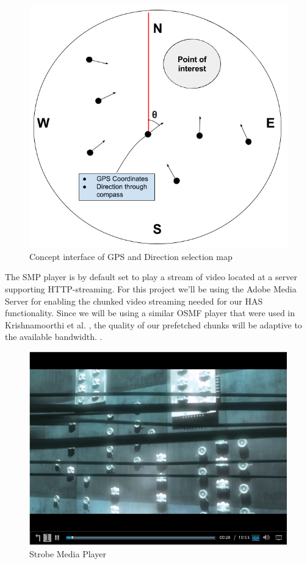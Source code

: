 \documentclass[9pt,a4paper]{acmproc}
\begin{document}
\begin{figure}[t!]
\begin{center}
	\includegraphics[scale=0.5]{teomet.png}
	\caption{Concept interface of GPS and Direction selection map}
	\label{fig:gpsinterface}
\end{center}
\end{figure}


The SMP player is by default set to play a stream of video located at a server supporting HTTP-streaming. For this project we'll be using the Adobe Media Server for enabling the chunked video streaming needed for our HAS functionality. Since we will be using a similar OSMF player that were used in Krishnamoorthi et al. \cite{hasmultipath}, the quality of our prefetched chunks will be adaptive to the available bandwidth. \cite{hasmultipath}.

\begin{figure}[t!]
\begin{center}
	\includegraphics[scale=0.5]{Media_player.png}
	\caption{Strobe Media Player}
	\label{fig:mediaplayer}
\end{center}
\end{figure}
\end{document}
